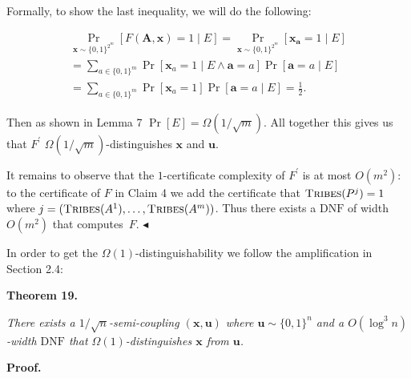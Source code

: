 \documentclass[10pt,a4paper]{article}
\begin{document}
Formally, to show the last inequality, we will do the following:\par


\[\begin{gathered}
\displaystyle\Pr_{\bm{x}\sim\{0,1\}^{2^{m}}}[F(\bm{A},\bm{x})=1\mid E] \displaystyle=\Pr_{\bm{x}\sim\{0,1\}^{2^{m}}}[\bm{x}_{\bm{a}}=1\mid E] \\
\displaystyle=\sum_{a\in\{0,1\}^{m}}\Pr[\bm{x}_{a}=1\mid E\land\bm{a}=a]\Pr[\bm{a}=a\mid E] \\
\displaystyle=\sum_{a\in\{0,1\}^{m}}\Pr[\bm{x}_{a}=1]\Pr[\bm{a}=a\mid E]=\frac{1}{2}.
\end{gathered}\]


Then as shown in Lemma 7 $\Pr[E]=\Omega(1/\sqrt{m})$. All together this gives us that $F^{\prime}$ $\Omega(1/\sqrt{m})$-distinguishes $\bm{x}$ and $\bm{u}$.\par




It remains to observe that the $1$-certificate complexity of $F^{\prime}$ is at most $O(m^{2})$: to the certificate of $F$ in Claim 4 we add the certificate that $\textsc{Tribes}(P^{j})=1$ where $j=(\textsc{Tribes}(A^{1}),\dots,\textsc{Tribes}(A^{m}))$. Thus there exists a $\mathrm{DNF}$ of width $O(m^{2})$ that computes $F$.
$\blacktriangleleft$\par




In order to get the $\Omega(1)$-distinguishability we follow the amplification in Section 2.4:\par





\par\medskip\noindent\textbf{
\textbf{Theorem 19}\textbf{.}
}\par



\emph{There exists a $1/\sqrt{n}$-semi-coupling $(\bm{x},\bm{u})$ where $\bm{u}\sim\{0,1\}^{n}$ and a $O(\log^{3}n)$-width $\mathrm{DNF}$ that $\Omega(1)$-distinguishes $\bm{x}$ from $\bm{u}$.}\par







\par\medskip\noindent\textbf{Proof.}\par
\end{document}
